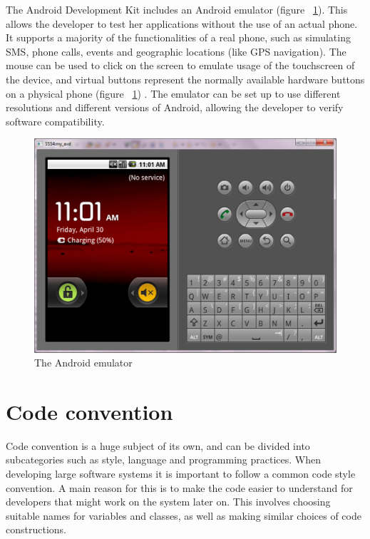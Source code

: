 The Android Development Kit includes an Android emulator (figure ~\ref{fig:androidEmulator}). This allows the developer to test her applications without the use of an actual phone. It supports a majority of the functionalities of a real phone, such as simulating SMS, phone calls, events and geographic locations (like GPS navigation). The mouse can be used to click on the screen to emulate usage of the touchscreen of the device, and virtual buttons represent the normally available hardware buttons on a physical phone (figure ~\ref{fig:androidEmulator}) . The emulator can be set up to use different resolutions and different versions of Android, allowing the developer to verify software compatibility. \citep{Android}

\clearpage
\begin{figure}[here]
\begin{center}
\includegraphics[scale=0.4]{pics/chapters/chapter2/emulator}
\end{center}
\caption{The Android emulator}
\label{fig:androidEmulator}
\end{figure}

\section{Code convention}

Code convention is a huge subject of its own, and can be divided into subcategories such as style, language and programming practices. When developing large software systems it is important to follow a common code style convention. A main reason for this is to make the code easier to understand for developers that might work on the system later on. This involves choosing suitable names for variables and classes, as well as making similar choices of code constructions. 

